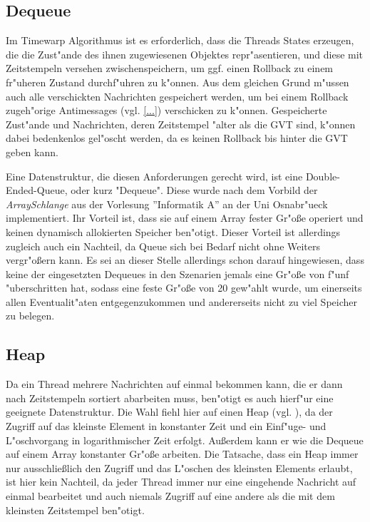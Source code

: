 \documentclass[a4paper, 10pt, openright, parskip, chapterprefix]{scrreprt}
\begin{document}
\subsection{Dequeue}
Im Timewarp Algorithmus ist es erforderlich, dass die Threads States erzeugen, die die Zust"ande des ihnen zugewiesenen
Objektes repr"asentieren, und diese mit Zeitstempeln versehen zwischenspeichern, um ggf. einen Rollback zu einem
fr"uheren Zustand durchf"uhren zu k"onnen. Aus dem gleichen Grund m"ussen auch alle verschickten Nachrichten gespeichert
werden, um bei einem Rollback zugeh"orige Antimessages (vgl. \ref{...}) verschicken zu k"onnen.
Gespeicherte Zust"ande und Nachrichten, deren Zeitstempel "alter als die GVT sind, k"onnen dabei bedenkenlos gel"oscht
werden, da es keinen Rollback bis hinter die GVT geben kann.

Eine Datenstruktur, die diesen Anforderungen gerecht wird, ist eine Double-Ended-Queue, oder kurz "Dequeue". Diese wurde
nach dem Vorbild der \emph{ArraySchlange} aus der Vorlesung ''Informatik A'' \cite{...} an der Uni Osnabr"ueck
implementiert. Ihr Vorteil ist, dass sie auf einem Array fester Gr"o\ss e operiert und keinen dynamisch allokierten
Speicher ben"otigt. Dieser Vorteil ist allerdings zugleich auch ein Nachteil, da Queue sich bei Bedarf nicht ohne
Weiters vergr"o\ss ern kann. Es sei an dieser Stelle allerdings schon darauf hingewiesen, dass keine der eingesetzten
Dequeues in den Szenarien jemals eine Gr"o\ss e von f"unf "uberschritten hat, sodass eine feste Gr"o\ss e von 20
gew"ahlt wurde, um einerseits allen Eventualit"aten entgegenzukommen und andererseits nicht zu viel Speicher zu belegen.

\subsection{Heap}
Da ein Thread mehrere Nachrichten auf einmal bekommen kann, die er dann nach Zeitstempeln sortiert abarbeiten muss,
ben"otigt es auch hierf"ur eine geeignete Datenstruktur. Die Wahl fiehl hier auf einen Heap (vgl. \cite{...}), da der
Zugriff auf das kleinste Element in konstanter Zeit und ein Einf"uge- und L"oschvorgang in logarithmischer Zeit erfolgt.
Au\ss erdem kann er wie die Dequeue auf einem Array konstanter Gr"o\ss e arbeiten.
Die Tatsache, dass ein Heap immer nur ausschlie\ss lich den Zugriff und das L"oschen des kleinsten Elements erlaubt, ist
hier kein Nachteil, da jeder Thread immer nur eine eingehende Nachricht auf einmal bearbeitet und auch niemals Zugriff auf eine
andere als die mit dem kleinsten Zeitstempel ben"otigt.
\end{document}
